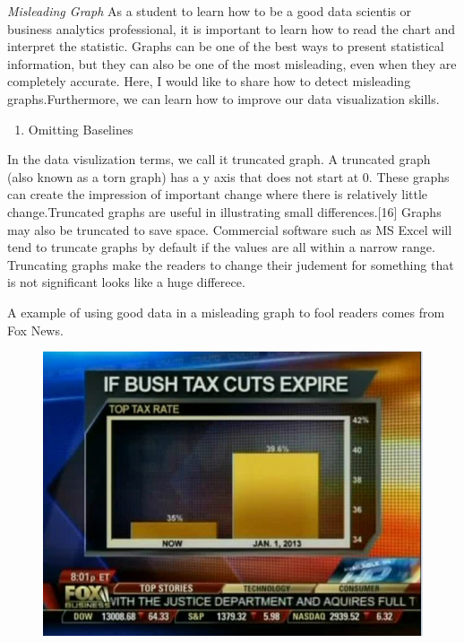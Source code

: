 \documentclass[]{book}
\providecommand{\tightlist}{%
  \setlength{\itemsep}{0pt}\setlength{\parskip}{0pt}}
\theoremstyle{definition}
\theoremstyle{definition}
\theoremstyle{definition}
\theoremstyle{remark}
\begin{document}
\emph{Misleading Graph} As a student to learn how to be a good data
scientis or business analytics professional, it is important to learn
how to read the chart and interpret the statistic. Graphs can be one of
the best ways to present statistical information, but they can also be
one of the most misleading, even when they are completely accurate.
Here, I would like to share how to detect misleading graphs.Furthermore,
we can learn how to improve our data visualization skills.

\begin{enumerate}
\def\labelenumi{\arabic{enumi}.}
\tightlist
\item
  Omitting Baselines
\end{enumerate}

In the data visulization terms, we call it truncated graph. A truncated
graph (also known as a torn graph) has a y axis that does not start at
0. These graphs can create the impression of important change where
there is relatively little change.Truncated graphs are useful in
illustrating small differences.{[}16{]} Graphs may also be truncated to
save space. Commercial software such as MS Excel will tend to truncate
graphs by default if the values are all within a narrow range.
Truncating graphs make the readers to change their judement for
something that is not significant looks like a huge differece.

A example of using good data in a misleading graph to fool readers comes
from Fox News.

\begin{figure}
\centering
\includegraphics{1.png}
\caption{}
\end{figure}
\end{document}

